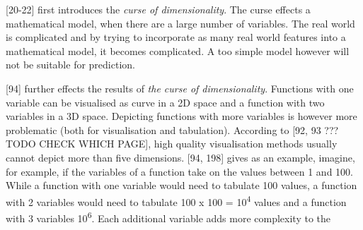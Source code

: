 \textcite{bellman1957dynamic}[20-22] first introduces the \textit{curse of dimensionality}. The curse effects a mathematical model, when there are a large number of variables. The real world is complicated and by trying to incorporate as many real world features into a mathematical model, it becomes complicated. A too simple model however will not be suitable for prediction.


\textcite{bellman2015adaptive}[94] further effects the results of \textit{the curse of dimensionality}. Functions with one variable can be visualised as curve in a 2D space and a function with two variables in a 3D space. Depicting functions with more variables is however more problematic (both for visualisation and tabulation). According to \textcite{DataMiningAndPredictiveAnalytics}[92, 93 ???TODO CHECK WHICH PAGE], high quality visualisation methods usually cannot depict more than five dimensions.
\textcite{bellman2015adaptive}[94, 198] gives as an example, imagine, for example, if the variables of a function take on the values between 1 and 100. While a function with one variable would need to tabulate 100 values, a function with 2 variables would need to tabulate 100 x 100 = 10\textsuperscript{4} values and a function with 3 variables 10\textsuperscript{6}. Each additional variable adds more complexity to the 








